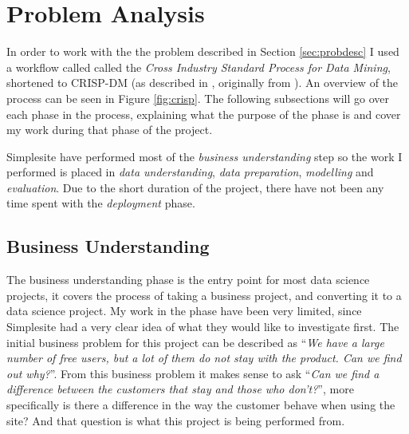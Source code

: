 \section{Problem Analysis}

In order to work with the the problem described in Section \ref{sec:probdesc} I
used a workflow called called the \textit{Cross Industry Standard Process for
Data Mining}, shortened to CRISP-DM (as described in \cite[p.
26]{provost2013data}, originally from \cite{shearer2000crisp}). An overview of
the process can be seen in Figure \ref{fig:crisp}. The following subsections
will go over each phase in the process, explaining what the purpose of the phase
is and cover my work during that phase of the project.


Simplesite have performed most of the \textit{business understanding} step so
the work I performed is placed in \textit{data understanding}, \textit{data
preparation}, \textit{modelling} and \textit{evaluation}. Due to the short
duration of the project, there have not been any time spent with the
\textit{deployment} phase.


\subsection{Business Understanding}

The business understanding phase is the entry point for most data science
projects, it covers the process of taking a business project, and converting it
to a data science project. My work in the phase have been very limited, since
Simplesite had a very clear idea of what they would like to investigate first.
The initial business problem for this project can be described as ``\textit{We
have a large number of free users, but a lot of them do not stay with the
product. Can we find out why?}''. From this business problem it makes sense to
ask ``\textit{Can we find a difference between the customers that stay and those
who don't?}'', more specifically is there a difference in the way the customer
behave when using the site? And that question is what this project is being
performed from.







